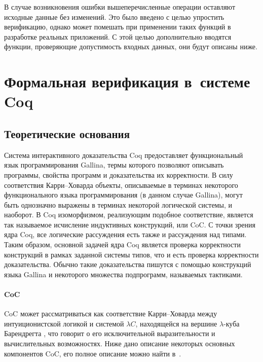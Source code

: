В случае возникновения ошибки вышеперечисленные операции оставляют исходные данные без изменений. Это было введено с целью упростить верификацию, однако может помешать при применении таких функций в разработке реальных приложений. С этой целью дополнительно вводятся функции, проверяющие допустимость входных данных, они будут описаны ниже.

\section{Формальная верификация в~системе Coq}

\subsection{Теоретические основания}

Система интерактивного доказательства Coq предоставляет функциональный язык программирования Gallina, термы которого позволяют описывать программы, свойства программ и доказательства их корректности. В силу соответствия Карри--Ховарда объекты, описываемые в терминах некоторого функционального языка программирования (в данном случае Gallina), могут быть однозначно выражены в терминах некоторой логической системы, и наоборот. В Coq изоморфизмом, реализующим подобное соответствие, является так называемое исчисление индуктивных конструкций, или CoC. С точки зрения ядра Coq, все логические рассуждения есть также и рассуждения над типами. Таким образом, основной задачей ядра Coq является проверка корректности конструкций в рамках заданной системы типов, что и есть проверка корректности доказательства. Обычно такие доказательства пишутся с помощью конструкций языка Gallina и некоторого множества подпрограмм, называемых тактиками.

\paragraph{CoC} CoC может рассматриваться как соответствие Карри--Ховарда между интуиционистской логикой и системой $\lambda C$, находящейся на вершине $\lambda$-куба Барендрегта , что говорит о его исключительной выразительности и вычислительных возможностях. Ниже дано описание некоторых основных компонентов CoC, его полное описание можно найти в~\autocite{CoqManual}.

